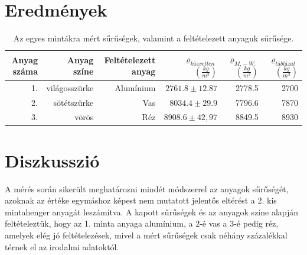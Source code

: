 \documentclass[10pt,pdftex]{report}
\begin{document}
\section*{Eredmények}
\begin{table}[H]
    \centering
    \begin{tabular}{|r|r|r|r|r|r|}
        \hline
        Anyag száma & Anyag színe & Feltételezett anyag & $\varrho_{közvetlen}$\footnotemark[9]$\left(\frac{kg}{m^3}\right)$ & $\varrho_{M.-W.}$\footnotemark[10]$\left(\frac{kg}{m^3}\right)$ & $\varrho_{táblázat}$\footnotemark[11]$\left(\frac{kg}{m^3}\right)$ \\
        \hline
        1. & világosszürke & Alumínium & $2761.8\pm12.87$ & 2778.5 & 2700 \\
        \hline
        2. & sötétszürke & Vas & $8034.4\pm29.9$ & 7796.6 & 7870 \\
        \hline
        3. & vörös & Réz & $8908.6\pm42,97$ & 8849.5 & 8930 \\
        \hline
    \end{tabular}
    \caption{Az egyes mintákra mért sűrűségek, valamint a feltételezett anyaguk sűrűsége.}
\end{table}
\section*{Diszkusszió}
A mérés során sikerült meghatározni mindét módszerrel az anyagok sűrűségét, azoknak az értéke egymáshoz képest nem mutatott jelentős eltérést a 2. kis mintahenger anyagát leszámítva. A kapott sűrűségek és az anyagok színe alapján feltételeztük, hogy az 1. minta anyaga alumínium, a 2-é vas a 3-é pedig réz, amelyek elég jó feltételezések, mivel a mért sűrűségek csak néhány százalékkal térnek el az irodalmi adatoktól.

\end{document}
